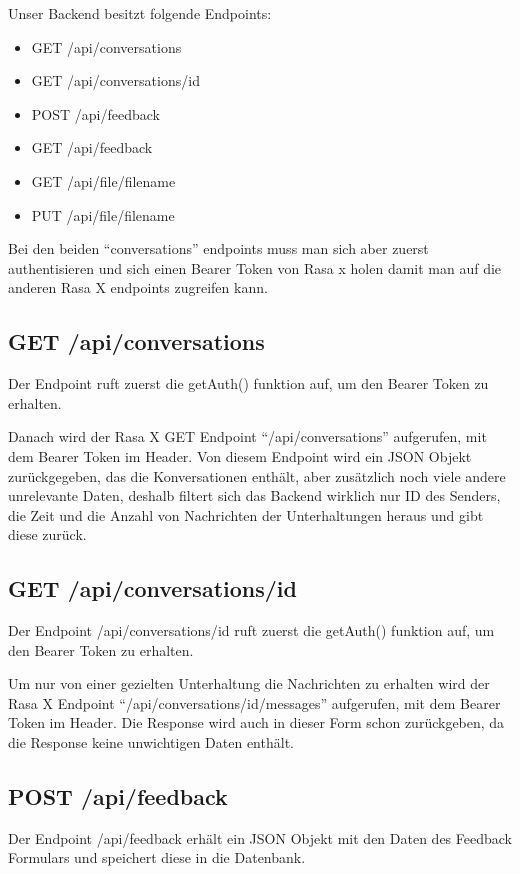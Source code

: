 Unser Backend besitzt folgende Endpoints:

\begin{itemize}
    \item GET /api/conversations
    \item GET /api/conversations/{id}
    \item POST /api/feedback
    \item GET /api/feedback
    \item GET /api/file/{filename}
    \item PUT /api/file/{filename}
\end{itemize}

Bei den beiden ``conversations'' endpoints muss man sich aber zuerst authentisieren und sich einen Bearer Token von Rasa x holen damit man auf die anderen Rasa X endpoints zugreifen kann.

\subsection{GET /api/conversations}
Der Endpoint ruft zuerst die getAuth() funktion auf, um den Bearer Token zu erhalten.

Danach wird der Rasa X GET Endpoint ``/api/conversations'' aufgerufen, mit dem Bearer Token im Header.
Von diesem Endpoint wird ein JSON Objekt zurückgegeben, das die Konversationen enthält, aber zusätzlich noch viele andere unrelevante Daten, deshalb filtert sich das Backend wirklich nur ID des Senders, die Zeit und die Anzahl von Nachrichten der Unterhaltungen heraus und gibt diese zurück.

\subsection{GET /api/conversations/{id}}
Der Endpoint /api/conversations/{id} ruft zuerst die getAuth() funktion auf, um den Bearer Token zu erhalten.

Um nur von einer gezielten Unterhaltung die Nachrichten zu erhalten wird der Rasa X Endpoint ``/api/conversations/{id}/messages'' aufgerufen, mit dem Bearer Token im Header.
Die Response wird auch in dieser Form schon zurückgeben, da die Response keine unwichtigen Daten enthält.

\subsection{POST /api/feedback}
Der Endpoint /api/feedback erhält ein JSON Objekt mit den Daten des Feedback Formulars und speichert diese in die Datenbank.

